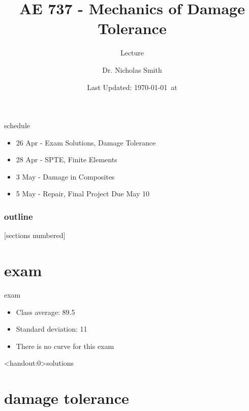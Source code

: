 \documentclass[10pt]{beamer}
\title{AE 737 - Mechanics of Damage Tolerance}
\subtitle{Lecture \arabic{lecture}}
\date{Last Updated: \today\ at \DTMcurrenttime}
\author{Dr. Nicholas Smith}
\institute{Wichita State University, Department of Aerospace Engineering}
\begin{document}
	
	\maketitle
	\begin{frame}{schedule}
		\begin{itemize}
			\item 26 Apr - Exam Solutions, Damage Tolerance
			\item 28 Apr - SPTE, Finite Elements
			\item 3 May - Damage in Composites
			\item 5 May - Repair, Final Project Due May 10
		\end{itemize}
	\end{frame}
	
	\begin{frame}
		\frametitle{outline}
		[sections numbered]
		\tableofcontents[hideallsubsections]
	\end{frame}

	\section{exam}
	\begin{frame}{exam}
		\begin{itemize}
			\item Class average: 89.5
			\item Standard deviation: 11%
			\item There is no curve for this exam
		\end{itemize}
	\end{frame}
	
	\begin{frame}<handout:0>{solutions}
		
	\end{frame}
	
	\section{damage tolerance}
	
\end{document}
